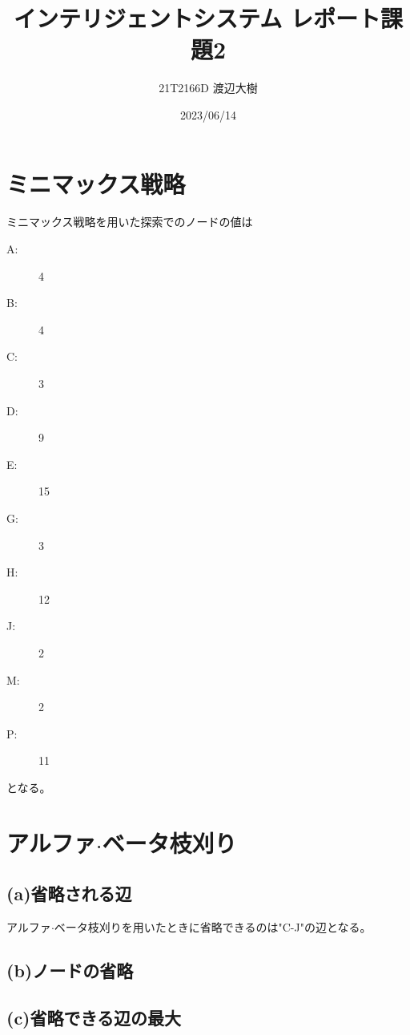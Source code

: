 \documentclass[a4paper,11pt,dvipdfmx]{jsarticle}
\begin{document}
\title{インテリジェントシステム レポート課題2}
\author{21T2166D 渡辺大樹}
\date{2023/06/14}
\maketitle
\section{ミニマックス戦略}
ミニマックス戦略を用いた探索でのノードの値は
\begin{center}
\begin{description}
    \item[A:] 4
    \item[B:] 4
    \item[C:] 3
    \item[D:] 9
    \item[E:] 15
    \item[G:] 3
    \item[H:] 12
    \item[J:] 2
    \item[M:] 2
    \item[P:] 11 
\end{description}
\end{center}
となる。

\section{アルファ$\cdot$ベータ枝刈り}
\subsection*{(a)省略される辺}
アルファ$\cdot$ベータ枝刈りを用いたときに省略できるのは"C-J"の辺となる。

\subsection*{(b)ノードの省略}

\subsection*{(c)省略できる辺の最大}
\end{document}

